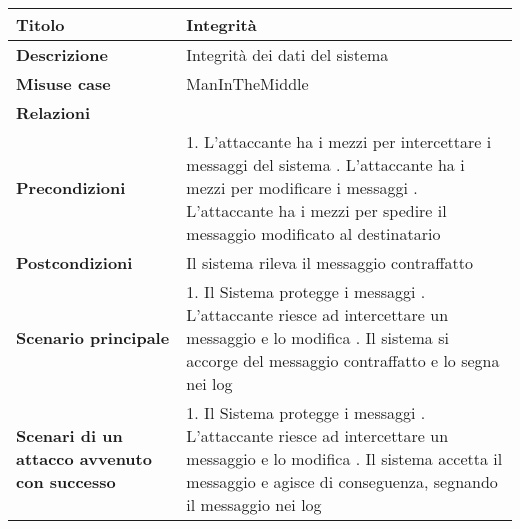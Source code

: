 \begin{tabular} {|P{4cm}|P{13cm}|}
\hline
\textbf{Titolo} & Integrità\\
\hline
  \textbf{Descrizione} & Integrità dei dati del sistema\\
\hline
  \textbf{Misuse case} & ManInTheMiddle\\
\hline
  \textbf{Relazioni} &\\
\hline
  \textbf{Precondizioni} & 1. L'attaccante ha i mezzi per intercettare i messaggi del sistema . L'attaccante ha i mezzi per modificare i messaggi . L'attaccante ha i mezzi per spedire il messaggio modificato al destinatario\\
\hline
  \textbf{Postcondizioni} & Il sistema rileva il messaggio contraffatto\\
\hline
  \textbf{Scenario principale} & 1. Il Sistema protegge i messaggi . L'attaccante riesce ad intercettare un messaggio e lo modifica . Il sistema si accorge del messaggio contraffatto e lo segna nei log\\
\hline
  \textbf{Scenari di un attacco avvenuto con successo} & 1. Il Sistema protegge i messaggi . L'attaccante riesce ad intercettare un messaggio e lo modifica . Il sistema accetta il messaggio e agisce di conseguenza, segnando il messaggio nei log\\
\hline
\end{tabular}
\\

